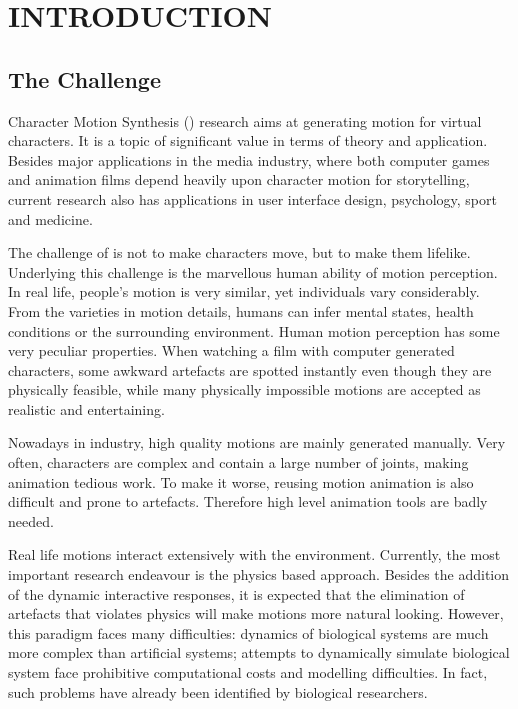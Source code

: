 \chapter{INTRODUCTION}
\label{chap:intro}

\graphicspath{{Introduction/IntroductionFigs/EPS/}{Introduction/IntroductionFigs/}}

\section{The Challenge}
Character Motion Synthesis (\cms) research aims at generating motion for virtual characters.
It is a topic of significant value in terms of theory and application. 
Besides major applications in the media industry, where both computer games and animation films depend heavily upon character motion for storytelling, 
current research also has applications in user interface design, psychology, sport and medicine.

The challenge of \cms  is not to make characters move, but  to make them lifelike. 
Underlying this challenge is the marvellous human ability of motion perception. 
In real life, people's motion is very similar, yet individuals vary considerably.
From the varieties in motion details, humans can infer mental states, health conditions or the surrounding environment.
Human motion perception has some very peculiar properties.
When watching a film with computer generated characters, some awkward artefacts are spotted instantly even though they are physically feasible, while many physically impossible motions are accepted as realistic and entertaining. 


Nowadays in industry, high quality motions are mainly generated manually. 
Very often, characters are complex and contain a large number of joints, making animation tedious work.
To make it worse, reusing motion animation is also difficult and prone to artefacts.
Therefore high level animation tools are badly needed. 



Real life motions interact extensively with the environment.
Currently, the most important research endeavour is the physics based approach.
Besides  the addition of the dynamic interactive responses, it is  expected that the elimination of  artefacts that violates physics  will make motions more natural looking.
However, this paradigm faces many difficulties:
dynamics of biological systems are much more complex than artificial systems;  attempts to dynamically simulate biological system face prohibitive  computational costs and modelling difficulties.
In fact, such problems have already been identified by biological researchers.







